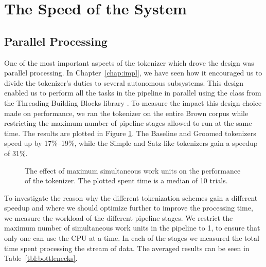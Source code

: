 \section{The Speed of the System}
\label{sec:eval-spd}

\subsection{Parallel Processing}
\label{ssec:eval-spd-parallel}

One of the most important aspects of the tokenizer which drove the design was
parallel processing. In Chapter~\ref{chap:impl}, we have seen how it encouraged
us to divide the tokenizer's duties to several autonomous subsystems. This
design enabled us to perform all the tasks in the pipeline in parallel using
the  class from the Threading Building Blocks library
\cite{web-tbb}. To measure the impact this design choice made on performance,
we ran the tokenizer on the entire Brown corpus while restricting the maximum
number of pipeline stages allowed to run at the same time. The results are
plotted in Figure \ref{fig:plot-work-units}. The Baseline and Groomed
tokenizers speed up by 17\%--19\%, while the Simple and Satz-like tokenizers
gain a speedup of 31\%.

\begin{figure}
  \begin{center}
    
    \caption{The effect of maximum simultaneous work units on the performance of
             the tokenizer. The plotted spent time is a median of 10 trials.}
    \label{fig:plot-work-units}
  \end{center}
\end{figure}

To investigate the reason why the different tokenization schemes gain a
different speedup and where we should optimize further to improve the
processing time, we measure the workload of the different pipeline stages. We
restrict the maximum number of simultaneous work units in the pipeline to 1, to
ensure that only one can use the CPU at a time. In each of the stages we
measured the total time spent processing the stream of data. The averaged
results can be seen in Table~\ref{tbl:bottlenecks}.

